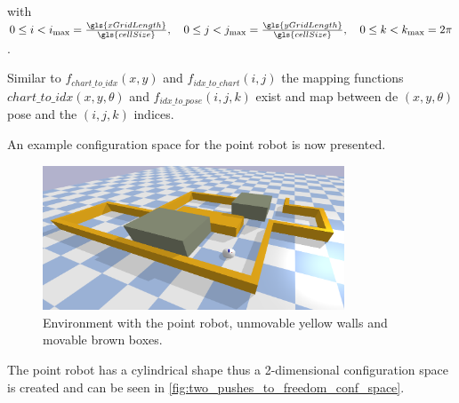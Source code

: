 with $0 \leq i < i_{\textrm{max}} = \frac{\gls{xGridLength}}{\gls{cellSize}}, \quad 0 \leq j < j_{\textrm{max}} = \frac{\gls{yGridLength}}{\gls{cellSize}}, \quad 0 \leq k < k_{\textrm{max}} = 2\pi$.\bs

Similar to $f_\mathit{chart\_to\_idx}(x, y)$ and $f_\mathit{idx\_to\_chart}(i,j)$ the mapping functions $\mathit{chart\_to\_idx}(x, y, \theta)$ and $f_\mathit{idx\_to\_pose}(i, j, k)$ exist and map between de $(x, y, \theta)$ pose and the $(i, j, k)$ indices.\bs

An example configuration space for the point robot is now presented.
\begin{figure}[H]
    \centering
    \includegraphics[width=0.8\textwidth]{figures/planning/two_push_to_freedom_env}
    \caption{Environment with the point robot, unmovable yellow walls and movable brown boxes.}%
    \label{fig:two_pushes_to_freedom_env}
\end{figure}

The point robot has a cylindrical shape thus a 2-dimensional configuration space is created and can be seen in \cref{fig:two_pushes_to_freedom_conf_space}.

